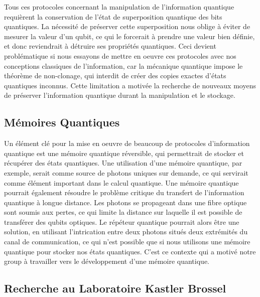  
Tous ces protocoles concernant la manipulation de l'information quantique requi\`erent la conservation de l'\'etat de superposition quantique des bits quantiques. La n\'ecessit\'e de pr\'eserver cette superposition nous oblige \`a \'eviter de mesurer la valeur d'un qubit, ce qui le forcerait \`a prendre une valeur bien d\'efinie, et donc reviendrait \`a d\'etruire ses propri\'et\'es quantiques. Ceci devient probl\'ematique si nous essayons de mettre en oeuvre ces protocoles avec nos conceptions classiques de l'information, car la m\'ecanique quantique impose le th\'eor\`eme de non-clonage, qui interdit de cr\'eer des copies exactes d'\'etats quantiques inconnus. Cette limitation a motiv\'ee la recherche de nouveaux moyens de pr\'eserver l'information quantique durant la manipulation et le stockage.

 

\subsection*{M\'emoires Quantiques}

Un \'el\'ement cl\'e pour la mise en oeuvre de beaucoup de protocoles d'information quantique est une m\'emoire quantique r\'eversible, qui permettrait de stocker et r\'ecup\'erer des \'etats quantiques.  Une utilisation d'une m\'emoire quantique, par exemple, serait comme source de photons uniques sur demande, ce qui servirait comme \'el\'ement important dans le calcul quantique. Une m\'emoire quantique pourrait \'egalement r\'esoudre le probl\`eme critique du transfert de l'information quantique \`a longue distance. Les photons se propageant dans une fibre optique sont soumis aux pertes, ce qui limite la distance sur laquelle il est possible de transf\'erer des qubits optiques. Le r\'ep\'eteur quantique pourrait alors \^etre une solution, en utilisant l'intrication entre deux photons situ\'es deux extr\'emit\'es du canal de communication, ce qui n'est possible que si nous utilisons une m\'emoire quantique pour stocker nos \'etats quantiques. C'est ce contexte qui a motiv\'e notre group \`a travailler vers le d\'eveloppement d'une m\'emoire quantique.



\subsection*{Recherche au Laboratoire Kastler Brossel}

